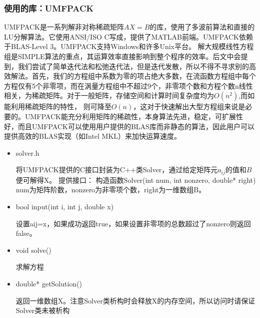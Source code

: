 \documentclass[12pt]{article}
\begin{document}
\subsubsection{使用的库：UMFPACK}
UMFPACK\cite{ump}是一系列解非对称稀疏矩阵$AX=B$的库，使用了多波前算法和直接的LU分解算法。它使用ANSI/ISO C写成，提供了MATLAB前端。UMFPACK依赖于BLAS-Level 3。UMFPACK支持Windows和许多Unix平台。
解大规模线性方程组是SIMPLE算法的重点，其运算效率直接影响到整个程序的效率。后文中会提到，我们尝试了简单迭代法和松弛迭代法，但是迭代发散，所以不得不寻求别的高效解法。首先，我们的方程组中系数为零的项占绝大多数，在流函数方程组中每个方程仅有5个非零项，而在涡量方程组中不超过9个，非零项个数和方程个数n线性相关，为稀疏矩阵。对于一般矩阵，存储空间和计算时间复杂度均为$O(n^2)$,而如能利用稀疏矩阵的特性，
则可降至$O(n)$，这对于快速解出大型方程组来说是必要的。UMFPACK能充分利用矩阵的稀疏性，本身算法先进，稳定，可扩展性好，而且UMFPACK可以使用用户提供的BLAS库而非静态的算法，因此用户可以提供高效的BLAS实现（如Intel MKL）来加快运算速度。
\begin{itemize}
\item solver.h

将UMFPACK提供的C接口封装为C++类Solver，通过给定矩阵元$a_{ij}$的值和$B$便可解得X。
提供接口：
构造函数Solver(int num, int nonzero, double* right)
num为矩阵阶数，nonzero为非零项个数，right为一维数组B。
\item bool input(int i, int j, double x)

设置aij=x，如果成功返回true，如果设置非零项的总数超过了nonzero则返回false。

\item void solve()

求解方程

\item double* getSolution()

返回一维数组X。注意Solver类析构时会释放X的内存空间，所以访问时请保证Solver类未被析构

\end{itemize}
\end{document}
